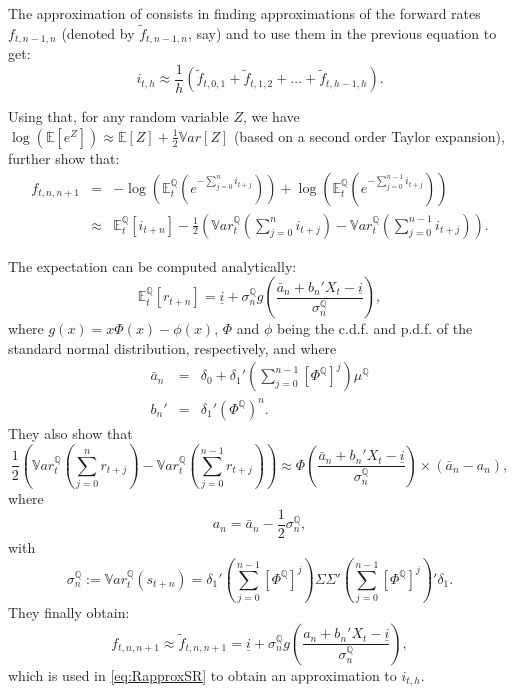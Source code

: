 \documentclass[
  12pt,
]{book}
\theoremstyle{definition}
\theoremstyle{definition}
\theoremstyle{definition}
\theoremstyle{definition}
\theoremstyle{remark}
\begin{document}
The approximation of \citet{Wu_Xia_2016} consists in finding approximations of the forward rates \(f_{t,n-1,n}\) (denoted by \(\tilde{f}_{t,n-1,n}\), say) and to use them in the previous equation to get:
\begin{equation}
\boxed{i_{t,h} \approx  \frac{1}{h}\left(\tilde{f}_{t,0,1}+\tilde{f}_{t,1,2}+\dots+\tilde{f}_{t,h-1,h}\right).}\label{eq:RapproxSR}
\end{equation}

Using that, for any random variable \(Z\), we have \(\log(\mathbb{E}[e^Z]) \approx \mathbb{E}[Z] + \frac{1}{2} \mathbb{V}ar[Z]\) (based on a second order Taylor expansion), \citet{Wu_Xia_2016} further show that:
\begin{eqnarray}
f_{t,n,n+1} &=& -\log\left(\mathbb{E}_t^{\mathbb{Q}}\left(e^{-\sum_{j=0}^n i_{t+j}}\right)\right) + \log\left(\mathbb{E}_t^{\mathbb{Q}}\left(e^{-\sum_{j=0}^{n-1} i_{t+j}}\right)\right)\\
&\approx& \mathbb{E}_t^{\mathbb{Q}}[i_{t+n}] - \frac{1}{2}\left(\mathbb{V}ar_t^{\mathbb{Q}}\left(\sum_{j=0}^n i_{t+j}\right)-\mathbb{V}ar_t^{\mathbb{Q}}\left(\sum_{j=0}^{n-1} i_{t+j}\right)\right).
\end{eqnarray}

The expectation can be computed analytically:
\[
\mathbb{E}_t^{\mathbb{Q}}[r_{t+n}] = \underline{i} + \sigma_n^{\mathbb{Q}}g\left(\frac{\bar{a}_n + b_n'X_t - \underline{i}}{\sigma_n^{\mathbb{Q}}}\right),
\]
where \(g(x)= x\Phi(x)-\phi(x)\), \(\Phi\) and \(\phi\) being the c.d.f. and p.d.f. of the standard normal distribution, respectively, and where
\begin{eqnarray*}
\bar{a}_n &=& \delta_0 + \delta_1'\left(\sum_{j=0}^{n-1} \left[\Phi^{\mathbb{Q}}\right]^j\right)\mu^{\mathbb{Q}}\\
b_n' &=& \delta_1'\left(\Phi^{\mathbb{Q}}\right)^n.
\end{eqnarray*}
They also show that
\[
\frac{1}{2}\left(\mathbb{V}ar_t^{\mathbb{Q}}\left(\sum_{j=0}^n r_{t+j}\right)-\mathbb{V}ar_t^{\mathbb{Q}}\left(\sum_{j=0}^{n-1} r_{t+j}\right)\right) \approx \Phi\left(\frac{\bar{a}_n + b_n'X_t - \underline{i}}{\sigma_n^{\mathbb{Q}}}\right)\times(\bar{a}_n - a_n),
\]
where
\[
a_n = \bar{a}_n - \frac{1}{2}\sigma_n^{\mathbb{Q}},
\]
with
\[
\sigma_n^{\mathbb{Q}} := \mathbb{V}ar^{\mathbb{Q}}_t\left(s_{t+n}\right)= \delta_1'\left(\sum_{j=0}^{n-1} \left[\Phi^{\mathbb{Q}}\right]^j\right)\Sigma \Sigma' \left(\sum_{j=0}^{n-1} \left[\Phi^{\mathbb{Q}}\right]^j\right)'\delta_1.
\]
They finally obtain:
\[
\boxed{f_{t,n,n+1} \approx \tilde{f}_{t,n,n+1} = \underline{i} + \sigma_n^{\mathbb{Q}}g\left(\frac{a_n + b_n'X_t - \underline{i}}{\sigma_n^{\mathbb{Q}}}\right),}
\]
which is used in \eqref{eq:RapproxSR} to obtain an approximation to \(i_{t,h}\).
\end{document}

